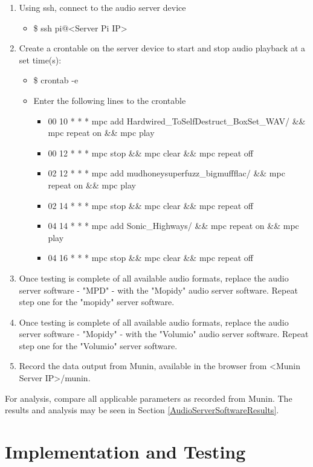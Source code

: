 \documentclass[11pt,a4paper]{scrreprt}
\begin{document}
\begin{enumerate}
  \item Using ssh, connect to the audio server device
  \begin{itemize}
    \item \$ ssh pi@<Server Pi IP>
  \end{itemize}
  \item Create a crontable on the server device to start and stop audio playback
  at a set time(s):
  \begin{itemize}
    \item \$ crontab -e
    \item Enter the following lines to the crontable
    \begin{itemize}
     \item 00 10 * * * mpc add Hardwired\_To\textendash{}Self\textendash{}Destruct\_BoxSet\_WAV/ \&\& mpc repeat on \&\& mpc play
     \item 00 12 * * * mpc stop \&\& mpc clear \&\& mpc repeat off
     \item 02 12 * * * mpc add
     mudhoney\textendash{}superfuzz\_bigmuff\textendash{}flac/ \&\& mpc repeat on \&\& mpc play
     \item 02 14 * * * mpc stop \&\& mpc clear \&\& mpc repeat off
     \item 04 14 * * * mpc add Sonic\_Highways/ \&\& mpc repeat on \&\& mpc play
     \item 04 16 * * * mpc stop \&\& mpc clear \&\& mpc repeat off
   \end{itemize}
  \end{itemize}
  \item Once testing is complete of all available audio formats, replace the audio
   server software - "MPD" - with the "Mopidy" audio server software. Repeat step
   one for the "mopidy" server software.
  \item Once testing is complete of all available audio formats, replace the audio
   server software - "Mopidy" - with the "Volumio" audio server software. Repeat
   step one for the "Volumio" server software.
  \item Record the data output from Munin, available in the browser from <Munin
  Server IP>/munin.
\end{enumerate}

For analysis, compare all applicable parameters as recorded from Munin.
The results and analysis may be seen in Section
\ref{AudioServerSoftwareResults}.

\chapter{Implementation and Testing}\label{implementation-and-testing}
\end{document}
